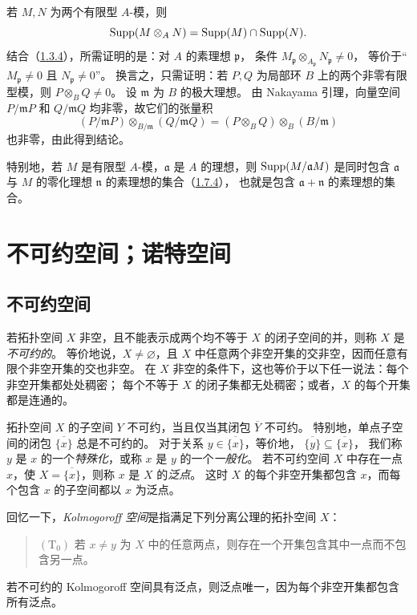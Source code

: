 若 $M,N$ 为两个有限型 $A$-模，则
\[
 \operatorname{Supp}(M\otimes_A N)=\operatorname{Supp}(M)\cap\operatorname{Supp}(N).
\]
结合（\hyperlink{para:0:1.3.4}{1.3.4}），所需证明的是：对 $A$ 的素理想 $\mathfrak p$，
条件 $M_{\mathfrak p}\otimes_{A_{\mathfrak p}}N_{\mathfrak p}\ne0$，
等价于“$M_{\mathfrak p}\ne0$ 且 $N_{\mathfrak p}\ne0$”。
换言之，只需证明：若 $P,Q$ 为局部环 $B$ 上的两个非零有限型模，则 $P\otimes_B Q\ne0$。
设 $\mathfrak m$ 为 $B$ 的极大理想。
由 Nakayama 引理，向量空间 $P/\mathfrak mP$ 和 $Q/\mathfrak mQ$ 均非零，故它们的张量积
\[
 (P/\mathfrak mP)\otimes_{B/\mathfrak m}(Q/\mathfrak mQ)
 =(P\otimes_B Q)\otimes_B(B/\mathfrak m)
\]
也非零，由此得到结论。

特别地，若 $M$ 是有限型 $A$-模，$\mathfrak a$ 是 $A$ 的理想，则
$\operatorname{Supp}(M/\mathfrak aM)$ 是同时包含 $\mathfrak a$ 与 $M$ 的零化理想 $\mathfrak n$ 的素理想的集合（\hyperlink{para:0:1.7.4}{1.7.4}），
也就是包含 $\mathfrak a+\mathfrak n$ 的素理想的集合。



\par

\section{不可约空间；诺特空间}\hypertarget{heading:0:2}{}
\subsection{不可约空间}\hypertarget{heading:0:2.1}{}

若拓扑空间 $X$ 非空，且不能表示成两个均不等于 $X$ 的闭子空间的并，则称 $X$ 是\emph{不可约的}。
等价地说，$X\ne\varnothing$，且 $X$ 中任意两个非空开集的交非空，因而任意有限个非空开集的交也非空。
在 $X$ 非空的条件下，这也等价于以下任一说法：每个非空开集都处处稠密；
每个不等于 $X$ 的闭子集都无处稠密；或者，$X$ 的每个开集都是连通的。

拓扑空间 $X$ 的子空间 $Y$ 不可约，当且仅当其闭包 $\overline Y$ 不可约。
特别地，单点子空间的闭包 $\overline{\{x\}}$ 总是不可约的。
对于关系 $y\in\overline{\{x\}}$，等价地，
$\overline{\{y\}}\subseteq\overline{\{x\}}$，
我们称 $y$ 是 $x$ 的一个\emph{特殊化}，或称 $x$ 是 $y$ 的一个\emph{一般化}。
若不可约空间 $X$ 中存在一点 $x$，使 $X=\overline{\{x\}}$，则称 $x$ 是 $X$ 的\emph{泛点}。
这时 $X$ 的每个非空开集都包含 $x$，而每个包含 $x$ 的子空间都以 $x$ 为泛点。

回忆一下，\emph{Kolmogoroff 空间}是指满足下列分离公理的拓扑空间 $X$：
\begin{quote}
$(\mathrm T_0)$ 若 $x\ne y$ 为 $X$ 中的任意两点，则存在一个开集包含其中一点而不包含另一点。
\end{quote}
若不可约的 Kolmogoroff 空间具有泛点，则泛点唯一，因为每个非空开集都包含所有泛点。

